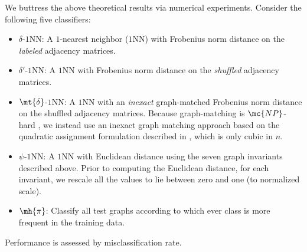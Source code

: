 \documentclass[10pt,journal,cspaper,compsoc]{IEEEtran}
\begin{document}
We buttress the above theoretical results via numerical experiments.  Consider the following five classifiers:
\begin{itemize}
	\item {$\delta$-$1$NN:}  A $1$-nearest neighbor ($1$NN) with Frobenius norm distance on the \emph{labeled} adjacency matrices.
	\item {$\delta'$-$1$NN:} A $1$NN with Frobenius norm distance on the \emph{shuffled} adjacency matrices.
	\item {$\mt{\delta}$-$1$NN:} A $1$NN with an \emph{inexact} graph-matched Frobenius norm distance on the shuffled adjacency matrices.  Because graph-matching is $\mc{NP}$-hard \cite{Garey1979}, we instead use an inexact graph matching approach based on the quadratic assignment formulation described in \cite{VP11_QAP}, which is only cubic in $n$.
	\item {$\psi$-$1$NN:} A $1$NN with Euclidean distance using the seven graph invariants described above.  Prior to computing the Euclidean distance, for each invariant, we rescale all the values to lie between zero and one (to normalized scale).
	\item {$\mh{\pi}$:} Classify all test graphs according to which ever class is more frequent in the training data.
\end{itemize}
Performance is assessed by misclassification rate.


% 
% 
\end{document}

